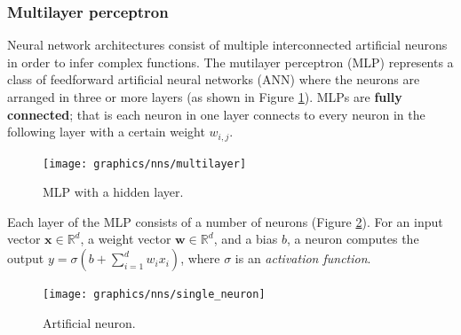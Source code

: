  	\subsubsection{Multilayer perceptron}  \label{Section 2.2.2.2}
	Neural network architectures consist of multiple interconnected artificial neurons in order to infer complex functions. The mutilayer perceptron (MLP) represents a class of feedforward artificial neural networks (ANN) where the neurons are arranged in three or more layers (as shown in Figure \ref{Fig: prep/ml/mlp/mlp}). MLPs are \textbf{fully connected}; that is each neuron in one layer connects to every neuron in the following layer with a certain weight $w_{i, j}$.

	\begin{figure}[H]
		\centering
		\texttt{[image: graphics/nns/multilayer]}
		\caption[Multilayer perceptron]{
			MLP with a hidden layer.
		}
		\label{Fig: prep/ml/mlp/mlp}	
	\end{figure}	

	 Each layer of the MLP consists of a number of neurons (Figure \ref{Fig: prep/ml/mlp/neuron}). For an input vector $\mathbf{x}\in\mathbb{R}^d$, a weight vector $\mathbf{w}\in\mathbb{R}^d$, and a bias $b$, a neuron computes the output $y = \sigma(b + \sum_{i=1}^{d} w_i x_i)$, where $\sigma$ is an \textit{activation function}.
	
	\begin{figure}[H]
		\centering
		
		\texttt{[image: graphics/nns/single\_neuron]}
		\caption[\textbf{Artificial neuron}]{
			Artificial neuron. 
		}
		\label{Fig: prep/ml/mlp/neuron}
	\end{figure}

